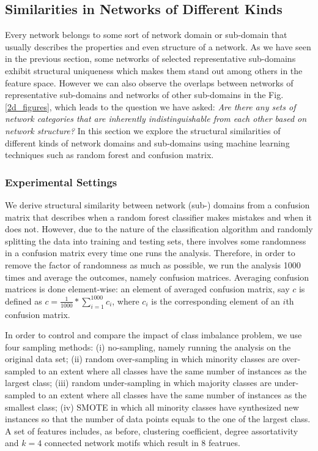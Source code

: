 \documentclass{article}
\begin{document}
\subsection{Similarities in Networks of Different Kinds}
Every network belongs to some sort of network domain or sub-domain that usually describes the properties and even structure of a network. As we have seen in the previous section, some networks of selected representative sub-domains exhibit structural uniqueness which makes them stand out among others in the feature space. However we can also observe the overlaps between networks of representative sub-domains and networks of other sub-domains in the Fig. \ref{2d_figures}, which leads to the question we have asked:  \textit{Are there any sets of network categories that are inherently indistinguishable from each other based on network structure?} In this section we explore the structural similarities of different kinds of network domains and sub-domains using machine learning techniques such as random forest and confusion matrix.  

\subsubsection{Experimental Settings}
We derive structural similarity between network (sub-) domains from a confusion matrix that describes when a random forest classifier makes mistakes and when it does not. However, due to the nature of the classification algorithm and randomly splitting the data into training and testing sets, there involves some randomness in a confusion matrix every time one runs the analysis. Therefore, in order to remove the factor of randomness as much as possible, we run the analysis 1000 times and average the outcomes, namely confusion matrices. Averaging confusion matrices is done element-wise: an element of averaged confusion matrix, say $c$ is defined as $c = \frac{1}{1000}*\sum_{i=1}^{1000} c_i$, where $c_i$ is the corresponding element of an $i$th confusion matrix.

In order to control and compare the impact of class imbalance problem, we use four sampling methods: (i) no-sampling, namely running the analysis on the original data set; (ii) random over-sampling in which minority classes are over-sampled to an extent where all classes have the same number of instances as the largest class; (iii) random under-sampling in which majority classes are under-sampled to an extent where all classes have the same number of instances as the smallest class; (iv) SMOTE in which all minority classes have synthesized new instances so that the number of data points equals to the one of the largest class. A set of features includes, as before, clustering coefficient, degree assortativity and $k = 4$ connected network motifs which result in 8 featrues.
 
\end{document}
